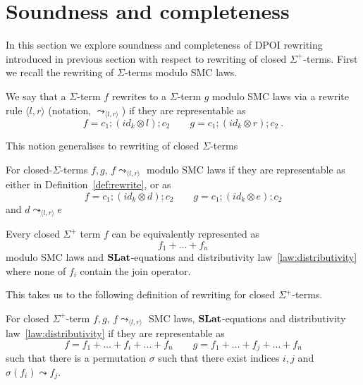 \section{Soundness and completeness}

In this section we explore soundness and completeness of DPOI rewriting introduced in previous section with respect to rewriting of closed $\Sigma^{+}$-terms.
First we recall the rewriting of $\Sigma$-terms modulo SMC laws.

\begin{definition}
\label{def:rewrite}
    We say that a $\Sigma$-term $f$ rewrites to a $\Sigma$-term $g$ modulo SMC laws via a rewrite rule $\langle l, r \rangle$ (notation, $\leadsto_{\langle l, r \rangle}$) if they are representable as
    \[
    f = c_{1};(id_{k} \otimes l);c_{2} \qquad g = c_{1};(id_{k} \otimes r);c_{2}~.
    \]
\end{definition}
This notion generalises to rewriting of closed $\Sigma$-terms
\begin{definition}
    For closed-$\Sigma$-terms $f,g$, $f \leadsto_{\langle l, r \rangle}$ modulo SMC laws if they are representable as either in Definition~\ref{def:rewrite}, or as 
    \[
    f = c_{1};(id_{k} \otimes d);c_{2} \qquad g = c_{1};(id_{k} \otimes e);c_{2}
    \]
    and $d \leadsto_{\langle l, r \rangle} e$
\end{definition}
\begin{lemma}
\label{lemma:normal_form}
    Every closed $\Sigma^{+}$ term $f$ can be equivalently represented as
    \[
    f_{1} + \ldots + f_{n}
    \] modulo SMC laws and $\mathbf{SLat}$-equations and distributivity law~\ref{law:distributivity} where none of $f_{i}$ contain the join operator.
\end{lemma}
This takes us to the following definition of rewriting for closed $\Sigma^{+}$-terms.
\begin{definition}
    For closed $\Sigma^{+}$-term $f,g$, $f \leadsto_{\langle l, r \rangle}$ SMC laws, $\mathbf{SLat}$-equations and distributivity law~\ref{law:distributivity} if they are representable as
    \[
    f = f_{1} + \ldots + f_{i} + \ldots + f_{n} \qquad g = f_{1} + \ldots + f_{j} + \ldots + f_{n}
    \]
    such that there is a permutation $\sigma$ such that there exist indices $i,j$ and $\sigma(f_{i}) \leadsto f_{j}$.
\end{definition}
